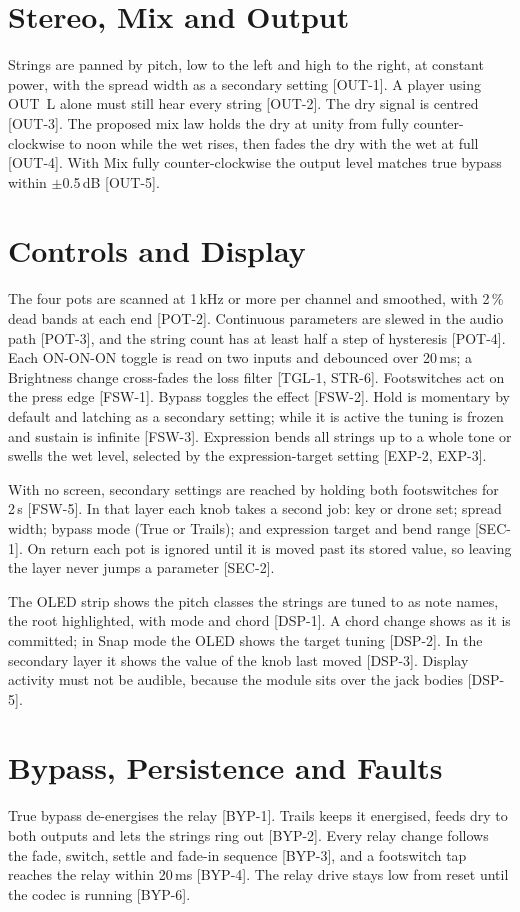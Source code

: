 \section{Stereo, Mix and Output}
Strings are panned by pitch, low to the left and high to the right, at constant power, with the spread width as a secondary setting [OUT-1]. A player using OUT~L alone must still hear every string [OUT-2]. The dry signal is centred [OUT-3]. The proposed mix law holds the dry at unity from fully counter-clockwise to noon while the wet rises, then fades the dry with the wet at full [OUT-4]. With Mix fully counter-clockwise the output level matches true bypass within $\pm$0.5\,dB [OUT-5].

\section{Controls and Display}
The four pots are scanned at 1\,kHz or more per channel and smoothed, with 2\,\% dead bands at each end [POT-2]. Continuous parameters are slewed in the audio path [POT-3], and the string count has at least half a step of hysteresis [POT-4]. Each ON-ON-ON toggle is read on two inputs and debounced over 20\,ms; a Brightness change cross-fades the loss filter [TGL-1, STR-6]. Footswitches act on the press edge [FSW-1]. Bypass toggles the effect [FSW-2]. Hold is momentary by default and latching as a secondary setting; while it is active the tuning is frozen and sustain is infinite [FSW-3]. Expression bends all strings up to a whole tone or swells the wet level, selected by the expression-target setting [EXP-2, EXP-3].

With no screen, secondary settings are reached by holding both footswitches for 2\,s [FSW-5]. In that layer each knob takes a second job: key or drone set; spread width; bypass mode (True or Trails); and expression target and bend range [SEC-1]. On return each pot is ignored until it is moved past its stored value, so leaving the layer never jumps a parameter [SEC-2].

The OLED strip shows the pitch classes the strings are tuned to as note names, the root highlighted, with mode and chord [DSP-1]. A chord change shows as it is committed; in Snap mode the OLED shows the target tuning [DSP-2]. In the secondary layer it shows the value of the knob last moved [DSP-3]. Display activity must not be audible, because the module sits over the jack bodies [DSP-5].

\section{Bypass, Persistence and Faults}
True bypass de-energises the relay [BYP-1]. Trails keeps it energised, feeds dry to both outputs and lets the strings ring out [BYP-2]. Every relay change follows the fade, switch, settle and fade-in sequence [BYP-3], and a footswitch tap reaches the relay within 20\,ms [BYP-4]. The relay drive stays low from reset until the codec is running [BYP-6].

